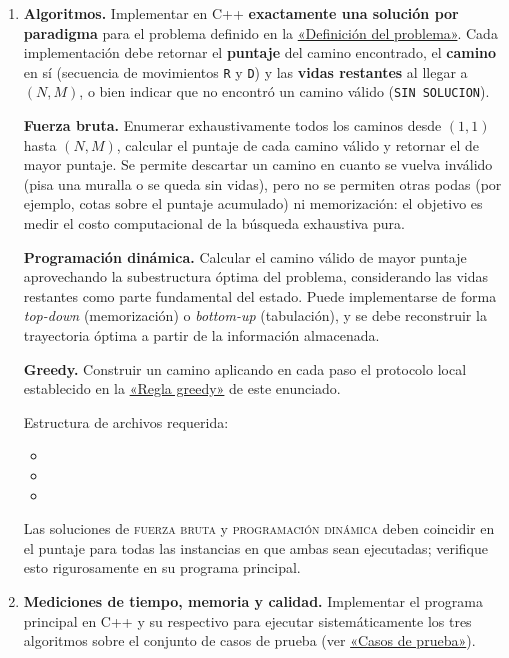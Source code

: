 \begin{enumerate}[(1)]
  \item \textbf{Algoritmos.} Implementar en C++ \textbf{exactamente una solución por paradigma} para el problema definido en la \hyperref[sec:problema]{«Definición del problema»}. Cada implementación debe retornar el \textbf{puntaje} del camino encontrado, el \textbf{camino} en sí (secuencia de movimientos \texttt{R} y \texttt{D}) y las \textbf{vidas restantes} al llegar a $(N,M)$, o bien indicar que no encontró un camino válido (\texttt{SIN SOLUCION}).

  \textbf{Fuerza bruta.} Enumerar exhaustivamente todos los caminos desde $(1,1)$ hasta $(N,M)$, calcular el puntaje de cada camino válido y retornar el de mayor puntaje. Se permite descartar un camino en cuanto se vuelva inválido (pisa una muralla o se queda sin vidas), pero no se permiten otras podas (por ejemplo, cotas sobre el puntaje acumulado) ni memorización: el objetivo es medir el costo computacional de la búsqueda exhaustiva pura.

  \textbf{Programación dinámica.} Calcular el camino válido de mayor puntaje aprovechando la subestructura óptima del problema, considerando las vidas restantes como parte fundamental del estado. Puede implementarse de forma \emph{top-down} (memorización) o \emph{bottom-up} (tabulación), y se debe reconstruir la trayectoria óptima a partir de la información almacenada.

  \textbf{Greedy.} Construir un camino aplicando en cada paso el protocolo local establecido en la \hyperref[subsec:regla-greedy]{«Regla greedy»} de este enunciado.

  Estructura de archivos requerida:
  \begin{itemize}
    \item {}
    \item {}
    \item {}
  \end{itemize}
  Las soluciones de \textsc{fuerza bruta} y \textsc{programación dinámica} deben coincidir en el puntaje para todas las instancias en que ambas sean ejecutadas; verifique esto rigurosamente en su programa principal.

  \item \textbf{Mediciones de tiempo, memoria y calidad.} Implementar el programa principal en C++ y su respectivo  para ejecutar sistemáticamente los tres algoritmos sobre el conjunto de casos de prueba (ver \hyperref[sec:casos-prueba]{«Casos de prueba»}).
  

\end{enumerate}
